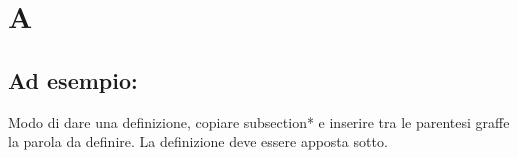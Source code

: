 \section*{A}
\markright{}
\subsection*{Ad esempio:}
Modo di dare una definizione, copiare subsection*{} e inserire tra le parentesi graffe la parola da definire. La definizione deve essere apposta sotto.
